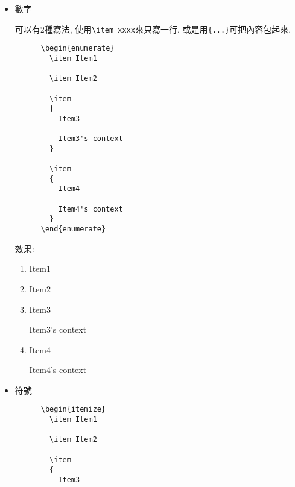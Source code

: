 \begin{itemize}
  \item
  {
    數字

    可以有2種寫法, 使用\verb|\item xxxx|來只寫一行, 或是用\verb|{...}|可把內容包起來.
    \begin{framed}
    \begin{verbatim}
      \begin{enumerate}
        \item Item1

        \item Item2

        \item
        {
          Item3

          Item3's context
        }

        \item
        {
          Item4

          Item4's context
        }
      \end{enumerate}
    \end{verbatim}
    \end{framed}

    效果:
    \begin{enumerate}
      \item Item1

      \item Item2

      \item
      {
        Item3

        Item3's context
      }

      \item
      {
        Item4

        Item4's context
      }
    \end{enumerate}
  } %

  \newpage
  \item
  {
    符號

    \begin{framed}
    \begin{verbatim}
      \begin{itemize}
        \item Item1

        \item Item2

        \item
        {
          Item3


\end{verbatim}
\end{framed}}
\end{itemize}
